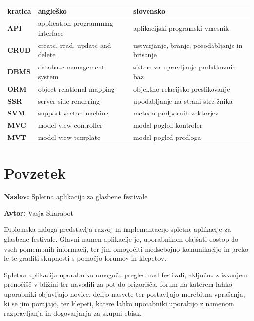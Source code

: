 \documentclass[a4paper,12pt,openright]{book}
\newcommand{\ttitle}{Spletna aplikacija za glasbene festivale}
\newcommand{\tauthor}{Vasja Škarabot}
\newcommand{\clearemptydoublepage}{\newpage{\pagestyle{empty}\cleardoublepage}}
\begin{document}
\noindent\begin{tabular}{p{}|p{}|p{}}    %
  {\bf kratica} & {\bf angleško}                              & {\bf slovensko} \\ \hline
  {\bf API}      & application programming interface               & aplikacijski programski vmesnik \\
  {\bf CRUD}    & create, read, update and delete & ustvarjanje, branje, posodabljanje in brisanje \\
  {\bf DBMS} & database management system & sistem za upravljanje podatkovnih baz \\
  {\bf ORM}  & object-relational mapping & objektno-relacijsko preslikovanje \\
  {\bf SSR}  & server-side rendering & upodabljanje na strani stre-žnika \\
  {\bf SVM}   & support vector machine              & metoda podpornih vektorjev \\
  {\bf MVC}  & model-view-controller & model-pogled-kontroler \\
  {\bf MVT}   & model-view-template  & model-pogled-predloga \\
\end{tabular}


\clearemptydoublepage

{}
\chapter*{Povzetek}

\noindent\textbf{Naslov:} \ttitle
\bigskip

\noindent\textbf{Avtor:} \tauthor
\bigskip

\noindent 
Diplomska naloga predstavlja razvoj in implementacijo spletne aplikacije za glasbene festivale. Glavni namen aplikacije je, uporabnikom olajšati
dostop do vseh pomembnih informacij, ter jim omogočiti medsebojno komunikacijo in preko le te graditi skupnosti s pomočjo forumov in klepetov. 

Spletna aplikacija uporabniku omogoča pregled nad festivali, vključno z iskanjem prenočišč v bližini ter navodili za pot do prizorišča, forum na katerem lahko uporabniki
objavljajo novice, delijo nasvete ter postavljajo morebitna vprašanja, ki se jim porajajo, ter klepeti, katere lahko uporabniki uporabijo z namenom razpravljanja in dogovarjanja za skupni obisk. 
\end{document}
